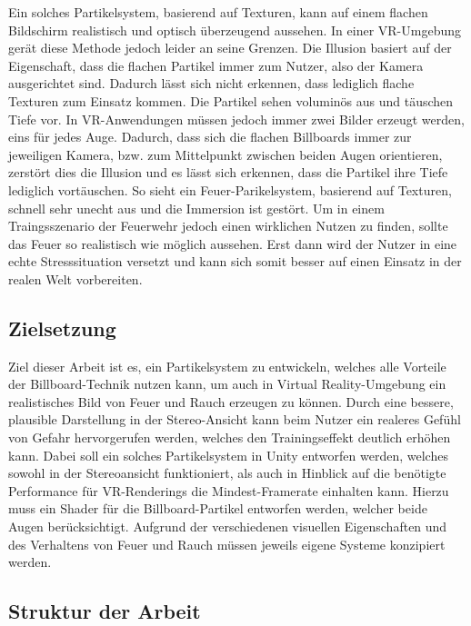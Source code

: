 Ein solches Partikelsystem, basierend auf Texturen, kann auf einem flachen Bildschirm realistisch
und optisch überzeugend aussehen. In einer VR-Umgebung gerät diese Methode jedoch leider an seine Grenzen.
Die Illusion basiert auf der Eigenschaft, dass die flachen Partikel immer zum Nutzer, also der Kamera
ausgerichtet sind. Dadurch lässt sich nicht erkennen, dass lediglich flache Texturen zum Einsatz kommen.
Die Partikel sehen voluminös aus und täuschen Tiefe vor.
In VR-Anwendungen müssen jedoch immer zwei Bilder erzeugt werden, eins für jedes Auge.
Dadurch, dass sich die flachen Billboards immer zur jeweiligen Kamera, bzw. zum Mittelpunkt
zwischen beiden Augen orientieren, zerstört dies die Illusion und es lässt sich erkennen, dass
die Partikel ihre Tiefe lediglich vortäuschen. So sieht ein Feuer-Parikelsystem, basierend auf Texturen,
schnell sehr unecht aus und die Immersion ist gestört.
Um in einem Traingsszenario der Feuerwehr jedoch einen wirklichen Nutzen zu finden, sollte das Feuer
so realistisch wie möglich aussehen. Erst dann wird der Nutzer in eine echte Stresssituation versetzt
und kann sich somit besser auf einen Einsatz in der realen Welt vorbereiten.

\subsection{Zielsetzung}

Ziel dieser Arbeit ist es, ein Partikelsystem zu entwickeln, welches alle Vorteile der Billboard-Technik
nutzen kann, um auch in Virtual Reality-Umgebung ein realistisches Bild von Feuer und Rauch erzeugen
zu können. Durch eine bessere, plausible Darstellung in der Stereo-Ansicht kann beim Nutzer ein realeres
Gefühl von Gefahr hervorgerufen werden, welches den Trainingseffekt deutlich erhöhen kann. Dabei soll
ein solches Partikelsystem in Unity entworfen werden, welches sowohl in der Stereoansicht funktioniert,
als auch in Hinblick auf die benötigte Performance für VR-Renderings die Mindest-Framerate einhalten kann.
Hierzu muss ein Shader für die Billboard-Partikel entworfen werden, welcher beide Augen berücksichtigt.
Aufgrund der verschiedenen visuellen Eigenschaften und des Verhaltens von Feuer und Rauch müssen jeweils
eigene Systeme konzipiert werden.



\subsection{Struktur der Arbeit}

